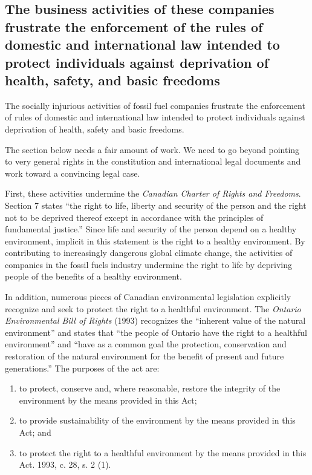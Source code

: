 	\subsection{The business activities of these companies frustrate the enforcement of the rules of domestic and international law intended to protect individuals against deprivation of health, safety, and basic freedoms}



The socially injurious activities of fossil fuel companies frustrate the enforcement of rules of domestic and international law intended to protect individuals against deprivation of health, safety and basic freedoms.  



\begin{vcom}
	The section below needs a fair amount of work. We need to go beyond pointing to very general rights in the constitution and international legal documents and work toward a convincing legal case.
\end{vcom}



First, these activities undermine the \emph{Canadian Charter of Rights and Freedoms}.  
Section 7 states ``the right to life, liberty and security of the person and the right not to be deprived thereof except in accordance with the principles of fundamental justice.''   
Since life and security of the person depend on a healthy environment, implicit in this statement is the right to a healthy environment.  
By contributing to increasingly dangerous global climate change, the activities of companies in the fossil fuels industry undermine the right to life by depriving people of the benefits of a healthy environment.  



In addition, numerous pieces of Canadian environmental legislation explicitly recognize and seek to protect the right to a healthful environment.
The \emph{Ontario Environmental Bill of Rights} (1993) recognizes the ``inherent value of the natural environment'' and states that ``the people of Ontario have the right to a healthful environment'' and ``have as a common goal the protection, conservation and restoration of the natural environment for the benefit of present and future generations.''  
The purposes of the act are:
\begin{enumerate}
	\item to protect, conserve and, where reasonable, restore the integrity of the environment by the means provided in this Act;
	\item to provide sustainability of the environment by the means provided in this Act; and
	\item to protect the right to a healthful environment by the means provided in this Act.  1993, c. 28, s. 2 (1).
\end{enumerate}

